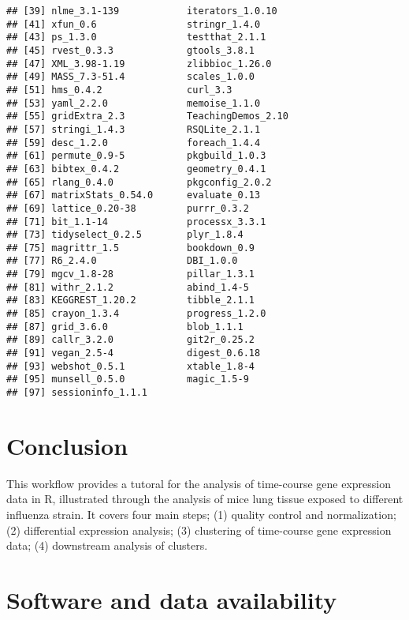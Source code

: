 \documentclass[9pt,a4paper,]{extarticle}
\begin{document}
\begin{verbatim}
## [39] nlme_3.1-139            iterators_1.0.10       
## [41] xfun_0.6                stringr_1.4.0          
## [43] ps_1.3.0                testthat_2.1.1         
## [45] rvest_0.3.3             gtools_3.8.1           
## [47] XML_3.98-1.19           zlibbioc_1.26.0        
## [49] MASS_7.3-51.4           scales_1.0.0           
## [51] hms_0.4.2               curl_3.3               
## [53] yaml_2.2.0              memoise_1.1.0          
## [55] gridExtra_2.3           TeachingDemos_2.10     
## [57] stringi_1.4.3           RSQLite_2.1.1          
## [59] desc_1.2.0              foreach_1.4.4          
## [61] permute_0.9-5           pkgbuild_1.0.3         
## [63] bibtex_0.4.2            geometry_0.4.1         
## [65] rlang_0.4.0             pkgconfig_2.0.2        
## [67] matrixStats_0.54.0      evaluate_0.13          
## [69] lattice_0.20-38         purrr_0.3.2            
## [71] bit_1.1-14              processx_3.3.1         
## [73] tidyselect_0.2.5        plyr_1.8.4             
## [75] magrittr_1.5            bookdown_0.9           
## [77] R6_2.4.0                DBI_1.0.0              
## [79] mgcv_1.8-28             pillar_1.3.1           
## [81] withr_2.1.2             abind_1.4-5            
## [83] KEGGREST_1.20.2         tibble_2.1.1           
## [85] crayon_1.3.4            progress_1.2.0         
## [87] grid_3.6.0              blob_1.1.1             
## [89] callr_3.2.0             git2r_0.25.2           
## [91] vegan_2.5-4             digest_0.6.18          
## [93] webshot_0.5.1           xtable_1.8-4           
## [95] munsell_0.5.0           magic_1.5-9            
## [97] sessioninfo_1.1.1
\end{verbatim}

\hypertarget{conclusion}{%
\section{Conclusion}\label{conclusion}}

This workflow provides a tutoral for the analysis of time-course gene
expression data in R, illustrated through the analysis of mice lung tissue
exposed to different influenza strain. It covers four main steps; (1) quality
control and normalization; (2) differential expression analysis; (3)
clustering of time-course gene expression data; (4) downstream analysis of
clusters.

\hypertarget{software-and-data-availability}{%
\section{Software and data availability}\label{software-and-data-availability}}
\end{document}
